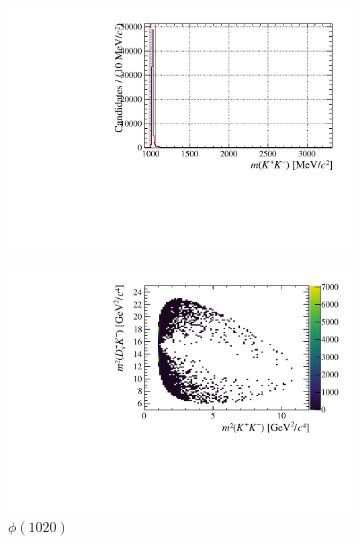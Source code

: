 \begin{figure}[!ht]
    \centering
        
    \begin{subfigure}[t]{0.32\textwidth}    
        \centering 
        \includegraphics[width=1.0\textwidth]{figs/B2DsPhi/phi_phi_mass.pdf}
    \end{subfigure}
    \begin{subfigure}[t]{0.32\textwidth}    
        \centering 
        \includegraphics[width=1.0\textwidth]{figs/B2DsPhi/phi_Dalitz_plot.pdf}
        \caption{$\phi(1020)$}
    \end{subfigure}
    \begin{subfigure}[t]{0.32\textwidth}    

\end{subfigure}
\end{figure}
